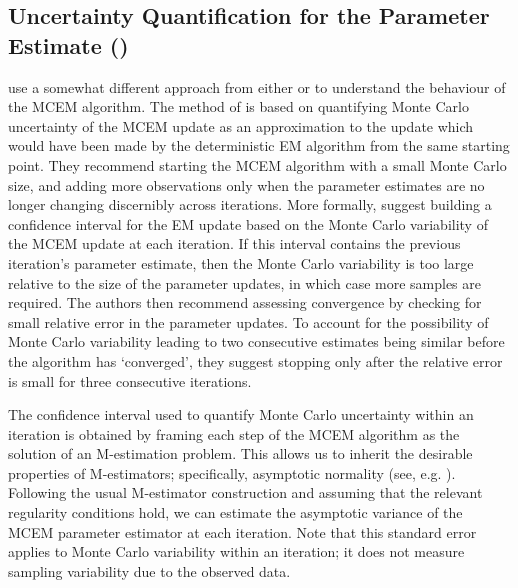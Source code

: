 \documentclass[ss]{imsart}
\theoremstyle{plain}
\theoremstyle{definition}
\theoremstyle{remark}
\begin{document}
    


\subsection{Uncertainty Quantification for the Parameter Estimate (\citealp{Boo99})}

 \citet{Boo99} use a somewhat different approach from either \citet{Wei90} or \citet{Cha95} to understand the behaviour of the MCEM algorithm. The method of \citeauthor{Boo99} is based on quantifying Monte Carlo uncertainty of the MCEM update as an approximation to the update which would have been made by the deterministic EM algorithm from the same starting point. They recommend starting the MCEM algorithm with a small Monte Carlo size, and adding more observations only when the parameter estimates are no longer changing discernibly across iterations. More formally, \citeauthor{Boo99} suggest building a confidence interval for the EM update based on the Monte Carlo variability of the MCEM update at each iteration. If this interval contains the previous iteration's parameter estimate, then the Monte Carlo variability is too large relative to the size of the parameter updates, in which case more samples are required. The authors then recommend assessing convergence by checking for small relative error in the parameter updates. To account for the possibility of Monte Carlo variability leading to two consecutive estimates being similar before the algorithm has `converged', they suggest stopping only after the relative error is small for three consecutive iterations.

The confidence interval used to quantify Monte Carlo uncertainty within an iteration is obtained by framing each step of the MCEM algorithm as the solution of an M-estimation problem. This allows us to inherit the desirable properties of M-estimators; specifically, asymptotic normality (see, e.g. \citealp{van98}). Following the usual M-estimator construction and assuming that the relevant regularity conditions hold, we can estimate the asymptotic variance of the MCEM parameter estimator at each iteration. Note that this standard error applies to Monte Carlo variability within an iteration; it does not measure sampling variability due to the observed data. 
\end{document}
